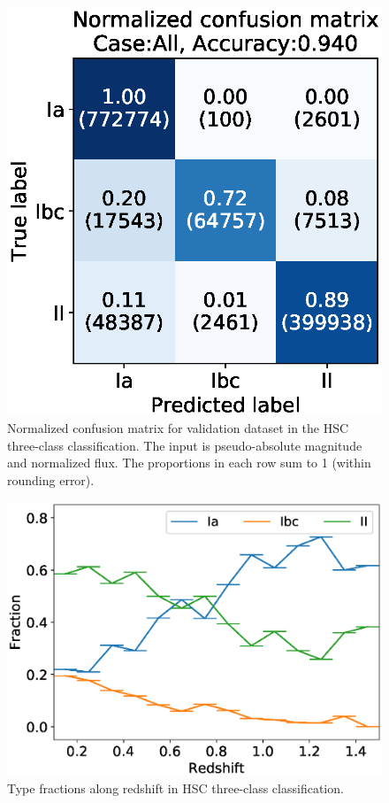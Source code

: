 \documentclass[useamsfonts]{pasj01}
\begin{document}
%
%
\begin{figure}[htbp]
  \begin{center}
     \includegraphics[width=\columnwidth]{figures/13_CM_abs-mag_scaled-flux_w-mixup_remove-y_predictions_validation_2_Flagall_weighted.eps}
  \end{center}
  \caption{%
  Normalized confusion matrix for validation dataset in the HSC three-class classification.
  The input is pseudo-absolute magnitude and normalized flux.
  The proportions in each row sum to 1 (within rounding error).
  }%
  \label{fig:h3_validation_CM}
\end{figure}
%
%
%
\begin{figure}[htbp]
  \begin{center}
     \includegraphics[width=\columnwidth]{figures/SNfrac_alongz.eps}
  \end{center}
  \caption{%
  Type fractions along redshift in HSC three-class classification.
  }%
  \label{fig:hsc3_type_frac_alongz}
\end{figure}
%
\end{document}
